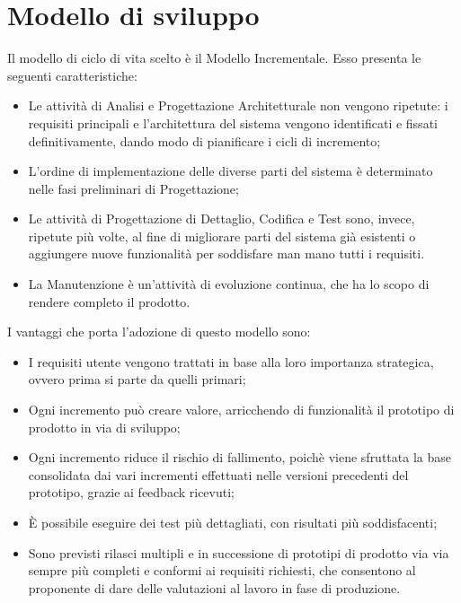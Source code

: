 \newpage
\section{Modello di sviluppo}
Il modello di ciclo di vita scelto è il Modello Incrementale. Esso presenta le seguenti caratteristiche:
\begin{itemize}
	\item Le attività di Analisi e Progettazione Architetturale non vengono ripetute: i requisiti principali e l'architettura del sistema vengono identificati e fissati definitivamente, dando modo di pianificare i cicli di incremento;
	\item L'ordine di implementazione delle diverse parti del sistema è determinato nelle fasi preliminari di Progettazione;
	\item Le attività di Progettazione di Dettaglio, Codifica e Test sono, invece, ripetute più volte, al fine di migliorare parti del sistema già esistenti o aggiungere nuove funzionalità per soddisfare man mano tutti i requisiti.
	\item La Manutenzione è un'attività di evoluzione continua, che ha lo scopo di rendere completo il prodotto.
\end{itemize}
I vantaggi che porta l'adozione di questo modello sono:
\begin{itemize}
	\item I requisiti utente vengono trattati in base alla loro importanza strategica, ovvero prima si parte da quelli primari;
	\item Ogni incremento può creare valore, arricchendo di funzionalità il prototipo di prodotto in via di sviluppo;
	\item Ogni incremento riduce il rischio di fallimento, poichè viene sfruttata la base consolidata dai vari incrementi effettuati nelle versioni precedenti del prototipo, grazie ai feedback ricevuti; 
	\item {\MakeUppercase{è}} possibile eseguire dei test più dettagliati, con risultati più soddisfacenti;
	\item Sono previsti rilasci multipli e in successione di prototipi di prodotto via via sempre più completi e conformi ai requisiti richiesti, che consentono al proponente di dare delle valutazioni al lavoro in fase di produzione.
\end{itemize}